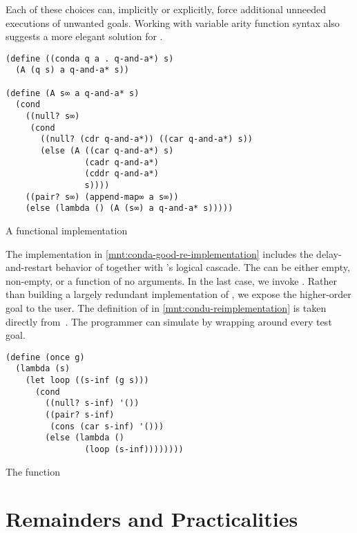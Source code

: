 \documentclass[sigplan,draft,balance,pbalance,natbib=false]{acmart}
\begin{document}
Each of these choices can, implicitly or explicitly, force additional
unneeded executions of unwanted goals. Working with variable arity
function syntax also suggests a more elegant solution for
.

\begin{listing}
  \begin{verbatim}
(define ((conda q a . q-and-a*) s)
  (A (q s) a q-and-a* s))

(define (A s∞ a q-and-a* s)
  (cond
    ((null? s∞)
     (cond
       ((null? (cdr q-and-a*)) ((car q-and-a*) s))
       (else (A ((car q-and-a*) s)
                (cadr q-and-a*)
                (cddr q-and-a*)
                s))))
    ((pair? s∞) (append-map∞ a s∞))
    (else (lambda () (A (s∞) a q-and-a* s)))))
  \end{verbatim}
  \caption{A functional  implementation}
  \label{mnt:conda-good-re-implementation}
\end{listing}

The implementation in \cref{mnt:conda-good-re-implementation} includes
the delay-and-restart behavior of  together with
's logical cascade. The  can be
either empty, non-empty, or a function of no arguments. In the last
case, we invoke . Rather than building a largely
redundant implementation of , we expose the
higher-order goal  to the user. The definition of
 in \cref{mnt:condu-reimplementation} is taken
directly from~\cite{friedman2018reasoned}. The programmer can simulate
 by wrapping  around every test
goal.

\begin{listing}
  \begin{verbatim}
(define (once g)
  (lambda (s)
    (let loop ((s-inf (g s)))
      (cond
        ((null? s-inf) '())
        ((pair? s-inf)
         (cons (car s-inf) '()))
        (else (lambda ()
                (loop (s-inf))))))))
  \end{verbatim}
  \caption{The  function} %
  \label{mnt:condu-reimplementation}
\end{listing}


\section{Remainders and Practicalities}\label{sec:functional}
\end{document}
